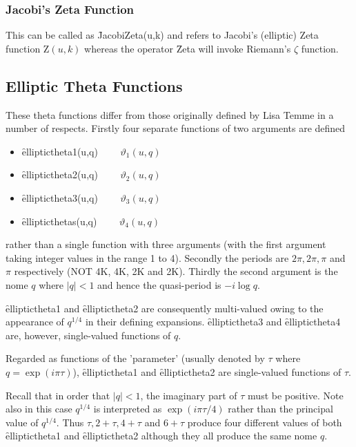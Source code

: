 \subsubsection{Jacobi's Zeta Function}

This can be called as \f{JacobiZeta(u,k)} and refers to Jacobi's (elliptic)
Zeta function $\mathrm{Z}(u,k)$ whereas the operator \f{Zeta} will invoke
Riemann's $\zeta$ function.

\subsection{Elliptic Theta Functions}

These theta functions differ from those originally defined by Lisa Temme
in a number of respects.
Firstly four separate functions of two arguments are defined
\begin{itemize}
\item \f{elliptictheta1(u,q)} $\qquad \vartheta_1(u, q)$
\item \f{elliptictheta2(u,q)} $\qquad \vartheta_2(u, q)$
\item \f{elliptictheta3(u,q)} $\qquad \vartheta_3(u, q)$
\item \f{ellipticthetas(u,q)} $\qquad \vartheta_4(u, q)$
\end{itemize}
rather than a single function with three arguments (with the first argument
taking integer values in the range 1 to 4).
Secondly the periods are $2\pi, 2\pi, \pi$ and $\pi$ respectively 
(NOT 4K, 4K, 2K and 2K).
Thirdly the second argument is the nome $q$ where $|q| < 1$ and hence
the quasi-period is $-i\log q$.

\f{elliptictheta1} and \f{elliptictheta2} are consequently multi-valued
owing to the appearance of $q^{1/4}$ in their defining expansions.
\f{elliptictheta3} and \f{elliptictheta4} are, however, single-valued
functions of $q$.

Regarded as functions of the 'parameter' (usually denoted by $\tau$ where
$q = \exp(i\pi\tau)$), \f{elliptictheta1} and \f{elliptictheta2} are
single-valued functions of $\tau$. 

Recall that in order that $|q| < 1$, the
imaginary part of $\tau$ must be positive. Note also
 in this case $q^{1/4}$ is interpreted as $\exp(i\pi\tau/4)$ rather than
the principal value of $q^{1/4}$. Thus $\tau, 2+\tau, 4+\tau$ and $6+\tau$
produce four different values of both \f{elliptictheta1} and \f{elliptictheta2}
although they all produce the same nome $q$.

